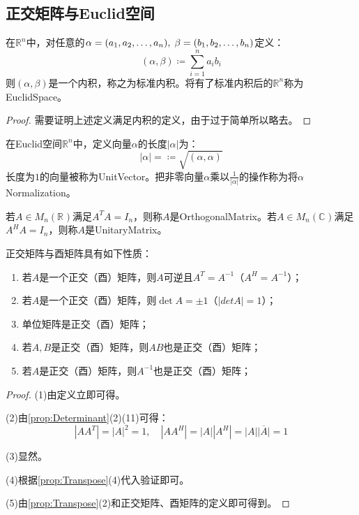 \subsection{正交矩阵与Euclid空间}
\begin{definition}
	在$\mathbb{R}^{n}$中，对任意的$\alpha=(a_1, a_2, \dots, a_{n}),\;\beta=(b_1, b_2, \dots, b_{n})$定义：
	\begin{equation*}
		(\alpha,\beta)\coloneq\sum_{i=1}^{n}a_ib_i
	\end{equation*}
	则$(\alpha,\beta)$是一个内积，称之为标准内积。将有了标准内积后的$\mathbb{R}^{n}$称为\gls{EuclidSpace}。
\end{definition}
\begin{proof}
	需要证明上述定义满足内积的定义，由于过于简单所以略去。
\end{proof}
\begin{definition}
	在Euclid空间$\mathbb{R}^{n}$中，定义向量$\alpha$的长度$|\alpha|$为：
	\begin{equation*}
		|\alpha|=\coloneq\sqrt{(\alpha,\alpha)}
	\end{equation*}
	长度为$1$的向量被称为\gls{UnitVector}。把非零向量$\alpha$乘以$\frac{1}{|\alpha|}$的操作称为将$\alpha$\gls{Normalization}。
\end{definition}
\begin{definition}
	若$A\in M_{n}(\mathbb{R}^{})$满足$A^TA=I_n$，则称$A$是\gls{OrthogonalMatrix}。若$A\in M_{n}(\mathbb{C}^{})$满足$A^HA=I_n$，则称$A$是\gls{UnitaryMatrix}。
\end{definition}
\begin{property}\label{prop:OrthogonalUnitaryMatrix}
	正交矩阵与酉矩阵具有如下性质：
	\begin{enumerate}
		\item 若$A$是一个正交（酉）矩阵，则$A$可逆且$A^T=A^{-1}$（$A^H=A^{-1}$）；
		\item 若$A$是一个正交（酉）矩阵，则$\det A=\pm1$（$|det A|=1$）；
		\item 单位矩阵是正交（酉）矩阵；
		\item 若$A,B$是正交（酉）矩阵，则$AB$也是正交（酉）矩阵；
		\item 若$A$是正交（酉）矩阵，则$A^{-1}$也是正交（酉）矩阵；
	\end{enumerate}
\end{property}
\begin{proof}
	(1)由定义立即可得。\par
	(2)由\cref{prop:Determinant}(2)(11)可得：
	\begin{equation*}
		|AA^T|=|A|^2=1,\quad|AA^H|=|A||A^H|=|A|\overline{|A|}=1
	\end{equation*}\par
	(3)显然。\par
	(4)根据\cref{prop:Transpose}(4)代入验证即可。\par
	(5)由\cref{prop:Transpose}(2)和正交矩阵、酉矩阵的定义即可得到。
\end{proof}